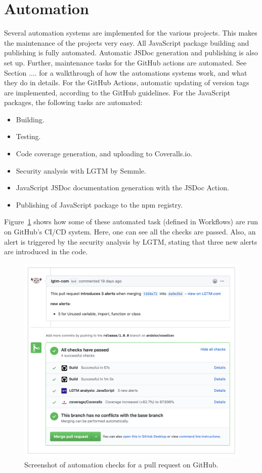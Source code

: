 \section{Automation}
Several automation systems are implemented for the various projects. This makes the maintenance of the projects very easy. All JavaScript package building and publishing is fully automated. Automatic JSDoc generation and publishing is also set up. Further, maintenance tasks for the GitHub actions are automated. See Section .... for a walkthrough of how the automations systems work, and what they do in details. For the GitHub Actions, automatic updating of version tags are implemented, according to the GitHub guidelines. For the JavaScript packages, the following tasks are automated:
\begin{itemize}
    \item Building.
    \item Testing.
    \item Code coverage generation, and uploading to Coveralls.io.
    \item Security analysis with LGTM by Semmle.
    \item JavaScript JSDoc documentation generation with the JSDoc Action.
    \item Publishing of JavaScript package to the npm registry.
\end{itemize}
Figure~\ref{fig:automation-pull-request} shows how some of these automated task (defined in Workflows) are run on GitHub's CI/CD system. Here, one can see all the checks are passed. Also, an alert is triggered by the security analysis by LGTM, stating that three new alerts are introduced in the code.
\begin{figure}[htp]
    \centering
    \includegraphics[width=\textwidth]{sections/result/figures/automation-pull-request.png}
    \caption{Screenshot of automation checks for a pull request on GitHub.}
    \label{fig:automation-pull-request}
\end{figure}

